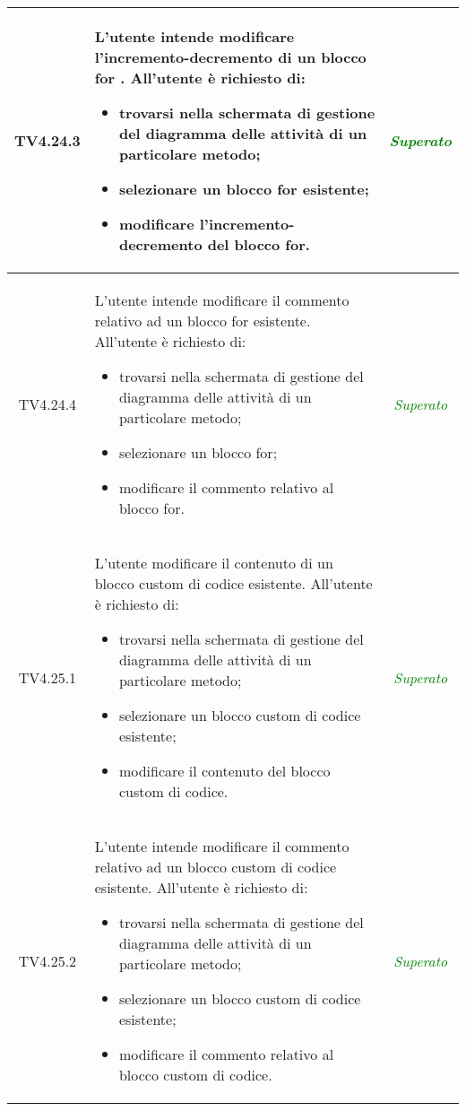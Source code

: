 \begin{longtable}{|c|>{}m{8cm}|c|}
\hypertarget{TV4.24.3}{TV4.24.3} & L'utente intende modificare l'incremento-decremento di un blocco for .
All'utente è richiesto di:
\begin{itemize}
	\item trovarsi nella schermata di gestione del diagramma delle attività di un particolare metodo;
	\item selezionare un blocco for esistente;
	\item modificare l'incremento-decremento del blocco for.
\end{itemize} & \textcolor{Green}{\textit{Superato}}\\ \hline

\hypertarget{TV4.24.4}{TV4.24.4} & L'utente intende modificare il commento relativo ad un blocco for esistente.
All'utente è richiesto di:
\begin{itemize}
	\item trovarsi nella schermata di gestione del diagramma delle attività di un particolare metodo;
	\item selezionare un blocco for;
	\item modificare il commento relativo al blocco for.
\end{itemize} & \textcolor{Green}{\textit{Superato}}\\ \hline

\hypertarget{TV4.25.1}{TV4.25.1} & L'utente modificare il contenuto di un blocco custom di codice esistente.
All'utente è richiesto di:
\begin{itemize}
	\item trovarsi nella schermata di gestione del diagramma delle attività di un particolare metodo;
	\item selezionare un blocco custom di codice esistente;
	\item modificare il contenuto del blocco custom di codice.
\end{itemize} & \textcolor{Green}{\textit{Superato}}\\ \hline

\hypertarget{TV4.25.2}{TV4.25.2} & L'utente intende modificare il commento relativo ad un blocco custom di codice esistente.
All'utente è richiesto di:
\begin{itemize}
	\item trovarsi nella schermata di gestione del diagramma delle attività di un particolare metodo;
	\item selezionare un blocco custom di codice esistente;
	\item modificare il commento relativo al blocco custom di codice.
\end{itemize} & \textcolor{Green}{\textit{Superato}}\\ \hline


\end{longtable}
